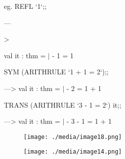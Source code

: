 \documentclass[12pt]{article}
\renewcommand{\_}{\kern-1.5pt\textunderscore\kern-1.5pt}
\begin{document}
\vspace{\baselineskip}
{\fontsize{13pt}{15.6pt}\selectfont eg. REFL `1`;;\par}\par

{\fontsize{14pt}{16.8pt}\selectfont —{\fontsize{13pt}{15.6pt}\selectfont > \par}\par}val it : thm = $ \vert $ - 1 = 1\par

SYM (ARITH\_RULE `1 + 1 = 2`);;\par

—> val it : thm = $ \vert $ - 2 = 1 + 1\par

TRANS (ARITH\_RULE `3 - 1 = 2`) it;;\par

—> val it : thm = $ \vert $ - 3 - 1 = 1 + 1\par


\vspace{\baselineskip}

\vspace{\baselineskip}

\vspace{\baselineskip}



\begin{figure}[H]
	\begin{FlushLeft}		\texttt{[image: ./media/image18.png]}
	\end{FlushLeft}\end{figure}



\par


\vspace{\baselineskip}

\vspace{\baselineskip}

\vspace{\baselineskip}



\begin{figure}[H]
	\begin{FlushLeft}		\texttt{[image: ./media/image14.png]}
	\end{FlushLeft}\end{figure}
\end{document}
